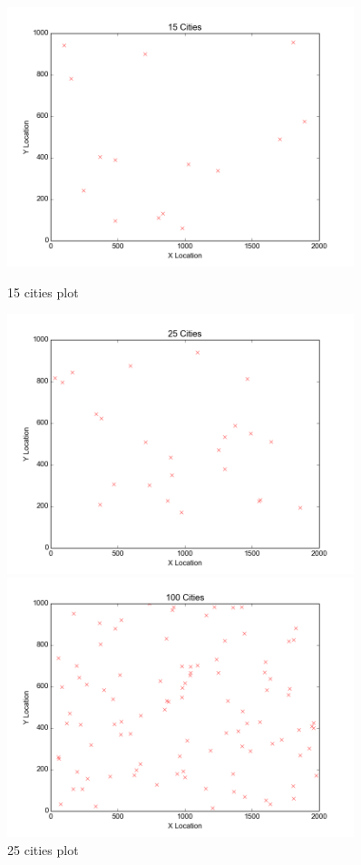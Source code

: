 \begin{figure}[h]
	\centering
	\begin{minipage}{0.5\textwidth}
	    \centering
	    \includegraphics[width=0.9\textwidth]{15cities.png}
	    \caption{15 cities plot}
	    \label{fig:15cities}
    \end{minipage}\hfill
	\begin{minipage}{0.5\textwidth}
	    \centering
	    \includegraphics[width=0.9\textwidth]{25cities.png}
	    \caption{25 cities plot}
	    \label{fig:25cities}
    \end{minipage}\hfill
	\begin{minipage}{0.5\textwidth}
	    \centering
	    \includegraphics[width=0.9\textwidth]{100cities.png}

\end{minipage}
\end{figure}

